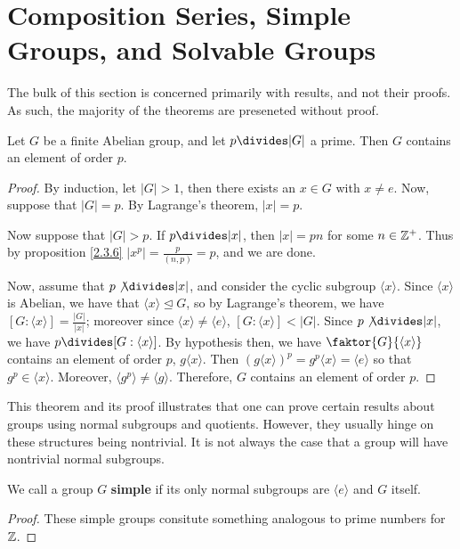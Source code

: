 \section{Composition Series, Simple Groups, and Solvable Groups}
\label{section_3.5}

The bulk of this section is concerned primarily with results, and not their
proofs. As such, the majority of the theorems are preseneted without proof.

\begin{theorem}\label{theorem_3.5.1}
  Let $G$ be a finite Abelian group, and let  $p \divides |G|$ a prime. Then
  $G$ contains an element of order  $p$.
\end{theorem}
\begin{proof}
  By induction, let $|G|>1$, then there exists an $x \in G$ with  $x \neq
  e$. Now, suppose that $|G|=p$. By  Lagrange's theorem, $|x|=p$.

  Now suppose that $|G|>p$. If $p \divides |x|$, then $|x|=pn$ for some
  $n \in \mathbb{Z}^+$. Thus by proposition \ref{2.3.6} $|x^p|=\frac{p}{(n,p)}=p$, and
  we are done.

  Now, assume that $p \not{\divides} |x|$, and consider the cyclic
  subgroup $\langle x \rangle$. Since $\langle x \rangle$ is Abelian,
  we have that $\langle x \rangle \unlhd G$, so by Lagrange's theorem,
  we have $[G: \langle x \rangle]=\frac{|G|}{|x|}$; moreover since
  $\langle x \rangle \neq \langle e \rangle$, $[G: \langle x \rangle]
  < |G|$. Since $p \not{\divides} |x|$, we have $p \divides [G :
  \langle x \rangle]$. By hypothesis then, we have $\faktor{G}{\langle
  x \rangle}$ contains an element of order $p$,  $g\langle x \rangle$.
  Then $(g\langle x \rangle)^p=g^p\langle x \rangle=\langle e \rangle$
  so that $g^p \in \langle x \rangle$. Moreover, $\langle g^p \rangle
  \neq \langle g \rangle$. Therefore, $G$ contains an element of order
  $p$.
\end{proof}
\begin{remark}
  This theorem and its proof illustrates that one can prove certain results
  about groups using normal subgroups and quotients. However, they usually
  hinge on these structures being nontrivial. It is not always the case that a
  group will have nontrivial normal subgroups.
\end{remark}

\begin{definition}
  We call a group $G$ \textbf{simple} if its only normal subgroups are
  $\langle e \rangle$ and $G$ itself.
\end{definition}
\begin{proof}
  These simple groups consitute something analogous to prime numbers
  for $\mathbb{Z}$.
\end{proof}

